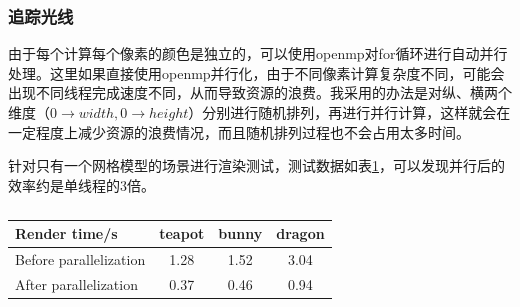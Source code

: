 \subsubsection {追踪光线}
由于每个计算每个像素的颜色是独立的，可以使用openmp对for循环进行自动并行处理。这里如果直接使用openmp并行化，由于不同像素计算复杂度不同，可能会出现不同线程完成速度不同，从而导致资源的浪费。我采用的办法是对纵、横两个维度（$0\rightarrow width,0\rightarrow height$）分别进行随机排列，再进行并行计算，这样就会在一定程度上减少资源的浪费情况，而且随机排列过程也不会占用太多时间。
\par 针对只有一个网格模型的场景进行渲染测试，测试数据如表\ref{table:parallel_trace}，可以发现并行后的效率约是单线程的3倍。\\
\begin{table}
    \centering
    \begin{tabular}{l c c c}
    Render time/s & teapot & bunny & dragon\\
    \hline
    Before parallelization & 1.28 & 1.52 & 3.04\\
    After parallelization & 0.37 & 0.46 & 0.94\\
    \end{tabular}
    \caption{}
    \label{table:parallel_trace}
\end{table}
